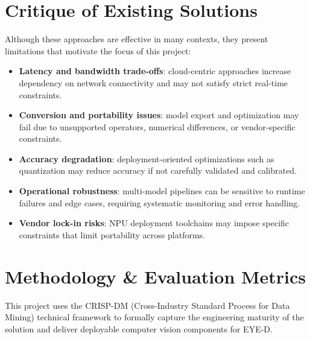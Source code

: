 \section{Critique of Existing Solutions}
Although these approaches are effective in many contexts, they present limitations that motivate the focus of this project:
\begin{itemize}
  \item \textbf{Latency and bandwidth trade-offs}: cloud-centric approaches increase dependency on network connectivity and may not satisfy strict real-time constraints.
  \item \textbf{Conversion and portability issues}: model export and optimization may fail due to unsupported operators, numerical differences, or vendor-specific constraints.
  \item \textbf{Accuracy degradation}: deployment-oriented optimizations such as quantization may reduce accuracy if not carefully validated and calibrated.
  \item \textbf{Operational robustness}: multi-model pipelines can be sensitive to runtime failures and edge cases, requiring systematic monitoring and error handling.
  \item \textbf{Vendor lock-in risks}: NPU deployment toolchains may impose specific constraints that limit portability across platforms.
\end{itemize}

\section{Methodology \& Evaluation Metrics}
This project uses the CRISP-DM (Cross-Industry Standard Process for Data Mining) technical framework to formally capture the engineering maturity of the solution and deliver deployable computer vision components for EYE-D.

